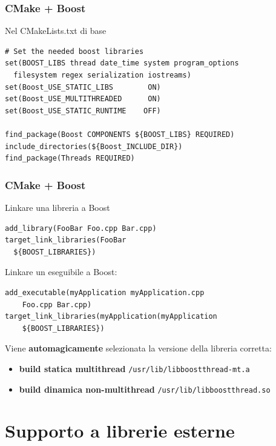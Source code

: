 \documentclass[10pt] {beamer}
\begin{document}
\begin{frame}[fragile]
 \frametitle{CMake + Boost}
Nel CMakeLists.txt di base
\begin{verbatim}
# Set the needed boost libraries 
set(BOOST_LIBS thread date_time system program_options 
  filesystem regex serialization iostreams)
set(Boost_USE_STATIC_LIBS        ON)
set(Boost_USE_MULTITHREADED      ON)
set(Boost_USE_STATIC_RUNTIME    OFF)

find_package(Boost COMPONENTS ${BOOST_LIBS} REQUIRED)
include_directories(${Boost_INCLUDE_DIR})
find_package(Threads REQUIRED)
\end{verbatim}

\end{frame}


\begin{frame}[fragile]
 \frametitle{CMake + Boost}
Linkare una libreria a Boost
\begin{verbatim}
add_library(FooBar Foo.cpp Bar.cpp)
target_link_libraries(FooBar 
  ${BOOST_LIBRARIES})
\end{verbatim}
Linkare un eseguibile a Boost:
\begin{verbatim}
add_executable(myApplication myApplication.cpp 
    Foo.cpp Bar.cpp)
target_link_libraries(myApplication(myApplication 
    ${BOOST_LIBRARIES})
\end{verbatim}
Viene \textbf{automagicamente} selezionata la versione della libreria corretta:
\begin{itemize}
\item \textbf{build statica multithread} \verb_/usr/lib/libboost_\verb_thread-mt.a_
\item \textbf{build dinamica non-multithread} \verb_/usr/lib/libboost_\verb_thread.so_
\end{itemize}
\end{frame}

\section{Supporto a librerie esterne}
\end{document}
